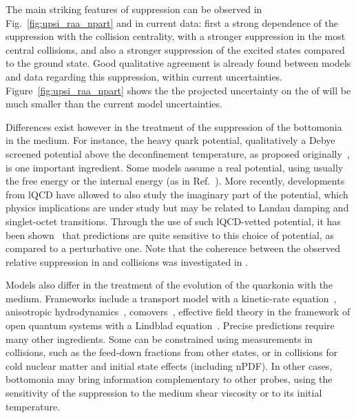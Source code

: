 \documentclass[../report.tex]{subfiles}
\providecommand{\main}{..}
\begin{document}
% 


The main striking features of \PGU suppression can be observed in Fig.~\ref{fig:upsi_raa_npart} and in current data: first a strong dependence of the suppression with the collision
centrality, with a stronger suppression in the most central collisions, and also a stronger suppression of the excited states compared to the ground state. Good qualitative agreement
is already found between models and data regarding this suppression, within current uncertainties. Figure~\ref{fig:upsi_raa_npart} shows the the projected uncertainty on the \raa of  will be much smaller than the current model uncertainties.

Differences exist however in the treatment of the suppression of the bottomonia in the medium.
For instance, the heavy quark potential, qualitatively a Debye screened potential above the deconfinement temperature, as proposed originally~\cite{Matsui:1986dk}, is one important
ingredient. Some models assume a real potential, using usually the free energy or the internal energy (as in Ref.~\cite{Du:2017qkv}). More recently, developments from lQCD
have allowed to also study the imaginary part of the potential, which physics implications are under study but may be related to Landau damping and singlet-octet transitions. Through the 
use of such lQCD-vetted potential, it has been shown~\cite{Krouppa:2017jlg} that predictions are quite sensitive to this choice of potential, as compared to a perturbative one. Note that the coherence between the observed relative suppression in \PbPb and \pPb collisions was investigated in \cite{Ferreiro:2018wbd}.

Models also differ in the treatment of the evolution of the quarkonia with the medium. Frameworks include a transport model with a kinetic-rate equation~\cite{Du:2017qkv},
anisotropic hydrodynamics~\cite{Krouppa:2017jlg}, comovers~\cite{Ferreiro:2018wbd}, effective field theory in the framework of open quantum systems with 
a Lindblad equation~\cite{Brambilla:2017zei}. Precise predictions require many other ingredients. Some can be constrained using measurements in \pp collisions, such as
the feed-down fractions from other states, or in \pPb collisions for cold nuclear matter and initial state effects (including nPDF). In other cases, bottomonia may bring information
complementary to other probes, using the sensitivity of the suppression to the medium shear viscosity or to its initial temperature.
\end{document}
